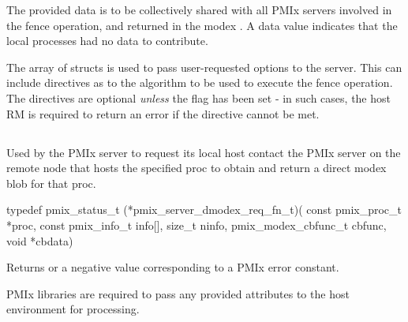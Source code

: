 The provided data is to be collectively shared with all \ac{PMIx} servers involved in the fence operation, and returned in the modex .
A  data value indicates that the local processes had no data to contribute.

The array of  structs is used to pass user-requested options to the server.
This can include directives as to the algorithm to be used to execute the fence operation.
The directives are optional \emph{unless} the  flag has been set - in such cases, the host \ac{RM} is required to return an error if the directive cannot be met.


\subsection{}

\summary

Used by the PMIx server to request its local host contact the \ac{PMIx} server on the remote node that hosts the specified proc to obtain and return a direct modex blob for that proc.

\format

\cspecificstart
\begin{codepar}
typedef pmix_status_t (*pmix_server_dmodex_req_fn_t)(
                             const pmix_proc_t *proc,
                             const pmix_info_t info[],
                             size_t ninfo,
                             pmix_modex_cbfunc_t cbfunc,
                             void *cbdata)
\end{codepar}
\cspecificend

\begin{arglist}
\end{arglist}

Returns  or a negative value corresponding to a PMIx error constant.

\reqattrstart
\ac{PMIx} libraries are required to pass any provided attributes to the host environment for processing.
\reqattrend

